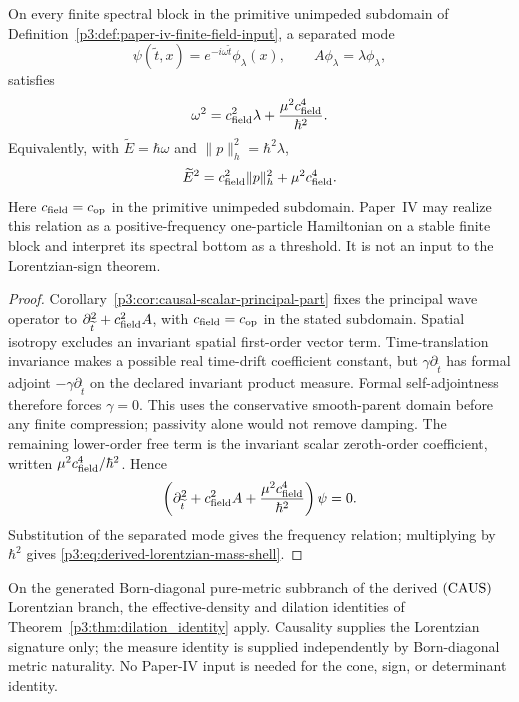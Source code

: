 \documentclass[12pt,a4paper]{article}
\begin{document}
\begin{theorem}
\label{p3:thm:p3-p4-lorentzian-chain-closure}
On every finite spectral block in the primitive unimpeded subdomain of
Definition~\ref{p3:def:paper-iv-finite-field-input}, a separated mode
\[
\psi(\widetilde t,x)=e^{-i\omega\widetilde t}\phi_\lambda(x),
\qquad
A\phi_\lambda=\lambda\phi_\lambda,
\]
satisfies
\[
        \omega^2=c_{\rm field}^2\lambda+
        \frac{\mu^2c_{\rm field}^4}{\hbar^2}.
\]
Equivalently, with \(\widetilde E=\hbar\omega\) and
\(\|p\|_h^2=\hbar^2\lambda\),
\begin{equation}
\label{p3:eq:derived-lorentzian-mass-shell}
\widetilde E^2=c_{\rm field}^2\|p\|_h^2+
\mu^2c_{\rm field}^4.
\end{equation}
Here \(c_{\rm field}=c_{\rm op}\) in the primitive unimpeded subdomain.
Paper~IV may realize this relation as a positive-frequency one-particle
Hamiltonian on a stable finite block and interpret its spectral bottom as a
threshold.  It is not an input to the Lorentzian-sign theorem.
\end{theorem}

\begin{proof}
Corollary~\ref{p3:cor:causal-scalar-principal-part} fixes the principal wave
operator to
\(\partial_{\widetilde t}^2+c_{\rm field}^2A\), with
\(c_{\rm field}=c_{\rm op}\) in the stated subdomain. Spatial isotropy
excludes an invariant spatial first-order vector term. Time-translation
invariance makes a possible real time-drift coefficient constant, but
$\gamma\partial_{\widetilde t}$ has formal adjoint
$-\gamma\partial_{\widetilde t}$ on the declared invariant product
measure. Formal self-adjointness therefore forces $\gamma=0$. This uses
the conservative smooth-parent domain before any finite compression;
passivity alone would not remove damping. The remaining lower-order free
term is the invariant scalar zeroth-order coefficient, written
\(\mu^2c_{\rm field}^4/\hbar^2\).  Hence
\[
\left(\partial_{\widetilde t}^2+c_{\rm field}^2A+
\frac{\mu^2c_{\rm field}^4}{\hbar^2}\right)\psi=0.
\]
Substitution of the separated mode gives the frequency relation; multiplying
by \(\hbar^2\) gives \eqref{p3:eq:derived-lorentzian-mass-shell}.
\end{proof}

\begin{corollary}
\label{p3:cor:closed-lorentzian-dilation-constraint}
On the generated Born-diagonal pure-metric subbranch of the derived
\(({\rm CAUS})\) Lorentzian branch, the effective-density and dilation
identities of Theorem~\ref{p3:thm:dilation_identity} apply.  Causality supplies
the Lorentzian signature only; the measure identity is supplied independently
by Born-diagonal metric naturality.  No Paper-IV input is needed for the cone,
sign, or determinant identity.
\end{corollary}
\end{document}
